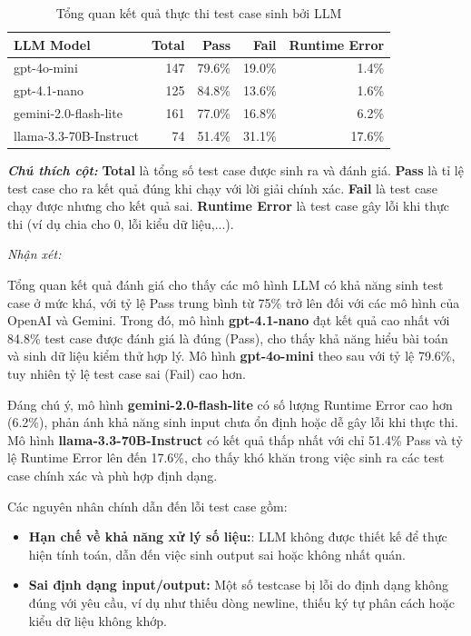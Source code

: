 \begin{table}[H]
\centering
\begin{tabular}{lrrrr}
\toprule
\textbf{LLM Model} & \textbf{Total} & \textbf{Pass} & \textbf{Fail} & \textbf{Runtime Error} \\
\midrule
gpt-4o-mini            & 147 & 79.6\% & 19.0\% & 1.4\%  \\
gpt-4.1-nano           & 125 & 84.8\% & 13.6\% & 1.6\%  \\
gemini-2.0-flash-lite  & 161 & 77.0\% & 16.8\% & 6.2\% \\
llama-3.3-70B-Instruct & 74  & 51.4\% & 31.1\% & 17.6\% \\
\bottomrule
\end{tabular}
\caption{Tổng quan kết quả thực thi test case sinh bởi LLM}
\vspace{0.5em}
\noindent
\textit{\textbf{Chú thích cột:}} 
\textbf{Total} là tổng số test case được sinh ra và đánh giá. 
\textbf{Pass} là tỉ lệ test case cho ra kết quả đúng khi chạy với lời giải chính xác. 
\textbf{Fail} là test case chạy được nhưng cho kết quả sai. 
\textbf{Runtime Error} là test case gây lỗi khi thực thi (ví dụ chia cho 0, lỗi kiểu dữ liệu,...).
\end{table}

\emph{Nhận xét: }

Tổng quan kết quả đánh giá cho thấy các mô hình LLM có khả năng sinh test case ở mức khá, với tỷ lệ Pass trung bình từ 75\% trở lên đối với các mô hình của OpenAI và Gemini. Trong đó, mô hình \textbf{gpt-4.1-nano} đạt kết quả cao nhất với 84.8\% test case được đánh giá là đúng (Pass), cho thấy khả năng hiểu bài toán và sinh dữ liệu kiểm thử hợp lý. Mô hình \textbf{gpt-4o-mini} theo sau với tỷ lệ 79.6\%, tuy nhiên tỷ lệ test case sai (Fail) cao hơn.

Đáng chú ý, mô hình \textbf{gemini-2.0-flash-lite} có số lượng Runtime Error cao hơn (6.2\%), phản ánh khả năng sinh input chưa ổn định hoặc dễ gây lỗi khi thực thi. Mô hình \textbf{llama-3.3-70B-Instruct} có kết quả thấp nhất với chỉ 51.4\% Pass và tỷ lệ Runtime Error lên đến 17.6\%, cho thấy khó khăn trong việc sinh ra các test case chính xác và phù hợp định dạng.

Các nguyên nhân chính dẫn đến lỗi test case gồm:
\begin{itemize}
    \item \textbf{Hạn chế về khả năng xử lý số liệu:}: LLM không được thiết kế để thực hiện tính toán, dẫn đến việc sinh output sai hoặc không nhất quán.
    \item \textbf{Sai định dạng input/output:} Một số testcase bị lỗi do định dạng không đúng với yêu cầu, ví dụ như thiếu dòng newline, thiếu ký tự phân cách hoặc kiểu dữ liệu không khớp.
\end{itemize}
